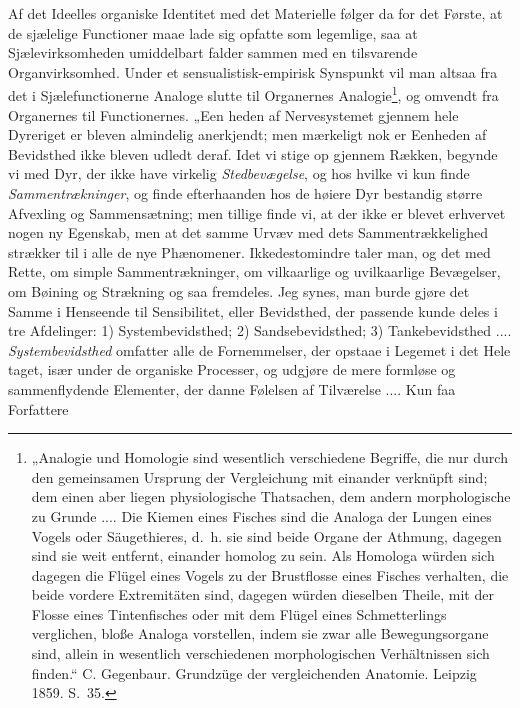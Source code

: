 \documentclass[11pt]{book}
\newcommand{\opage}[1]{\marginnote{\footnotesize\textit{[#1]}}}
\begin{document}
Af det Ideelles organiske Identitet med det Materielle følger da for
det Første, at de sjælelige Functioner maae lade sig opfatte som
legemlige, saa at Sjælevirksomheden umiddelbart falder sammen med en
tilsvarende Organvirksomhed. Under et sensualistisk-empirisk Synspunkt
vil man altsaa fra det i Sjælefunctionerne Analoge slutte til
Organernes Analogie\footnote{%
„Analogie und Homologie sind wesentlich verschiedene Begriffe, die nur
durch den gemeinsamen Ursprung der Vergleichung mit einander verknüpft
sind; dem einen aber liegen physiologische Thatsachen, dem andern
morphologische zu Grunde .... Die Kiemen eines Fisches sind die
Analoga der Lungen eines Vogels oder Säugethieres, d.~h. sie sind
beide Organe der Athmung, dagegen sind sie weit entfernt, einander
homolog zu sein. Als
Homologa würden sich dagegen die Flügel eines Vogels zu der
Brustflosse eines Fisches verhalten, die beide vordere Extremitäten
sind, dagegen würden dieselben Theile, mit der Flosse eines
Tintenfisches oder mit dem Flügel eines Schmetterlings verglichen,
bloße Analoga vorstellen, indem sie zwar alle Bewegungsorgane sind,
allein in wesentlich verschiedenen morphologischen Verhältnissen sich
finden.“ C. Gegenbaur. Grundzüge der vergleichenden Anatomie. Leipzig
1859. S.~35.
}, og omvendt fra Organernes til Functionernes. „Een\-%
\opage{364} \setcounter{footnote}{0}%
heden af Nervesystemet gjennem hele Dyreriget er bleven almindelig
anerkjendt; men mærkeligt nok er Eenheden af Bevidsthed ikke bleven
udledt deraf. Idet vi stige op gjennem Rækken, begynde vi med Dyr, der
ikke have virkelig \emph{Stedbevægelse}, og hos hvilke vi kun finde
\emph{Sammentrækninger}, og finde efterhaanden hos de høiere Dyr
bestandig større Afvexling og Sammensætning; men tillige finde vi, at
der ikke er blevet erhvervet nogen ny Egenskab, men at det samme Urvæv
med dets Sammentrækkelighed strækker til i alle de nye Phænomener.
Ikkedestomindre taler man, og det med Rette, om simple
Sammentrækninger, om vilkaarlige og uvilkaarlige Bevægelser, om
Bøining og Strækning og saa fremdeles. Jeg synes, man burde gjøre det
Samme i Henseende til Sensibilitet, eller Bevidsthed, der passende
kunde deles i tre Afdelinger: 1) Systembevidsthed; 2) Sandsebevidsthed;
3) Tankebevidsthed .... \emph{Systembevidsthed} omfatter alle de
Fornemmelser, der opstaae i Legemet i det Hele taget, især under de
organiske Processer, og udgjøre de mere formløse og sammenflydende
Elementer, der danne Følelsen af Tilværelse .... Kun faa Forfattere
\end{document}
